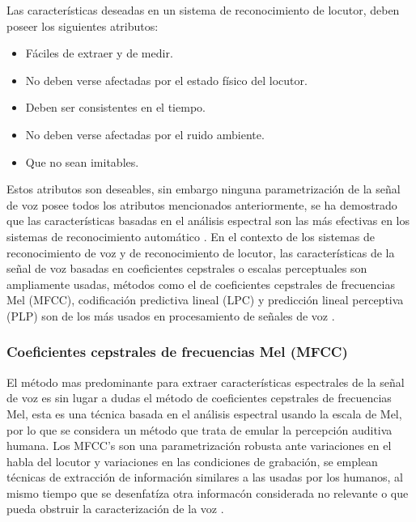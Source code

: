 Las caracter\'isticas deseadas en un sistema de reconocimiento de locutor, deben poseer los siguientes atributos:
\begin{itemize}
	\item F\'aciles de extraer y de medir.
	\item No deben verse afectadas por el estado f\'isico del locutor.
	\item Deben ser consistentes en el tiempo.
	\item No deben verse afectadas por el ruido ambiente.
	\item Que no sean imitables.\\
\end{itemize}

Estos atributos son deseables, sin embargo ninguna parametrizaci\'on de la señal de voz posee todos los atributos mencionados anteriormente, se ha demostrado que las caracter\'isticas basadas en el an\'alisis espectral son las m\'as efectivas en los sistemas de reconocimiento autom\'atico \cite{feng}. En el contexto de los sistemas de reconocimiento de voz y de reconocimiento de locutor, las caracter\'isticas de la señal de voz basadas en coeficientes cepstrales o escalas perceptuales son ampliamente usadas, m\'etodos como el de coeficientes cepstrales de frecuencias Mel (MFCC), codificaci\'on predictiva lineal (LPC) y predicci\'on lineal perceptiva (PLP) son de los m\'as usados en procesamiento de señales de voz \cite{namrata}.\\


\subsubsection{Coeficientes cepstrales de frecuencias Mel (MFCC)}

El m\'etodo mas predominante para extraer caracter\'isticas espectrales de la señal de voz es sin lugar a dudas el m\'etodo de coeficientes cepstrales de frecuencias Mel, esta es una t\'ecnica basada en el an\'alisis espectral usando la escala de Mel, por lo que se considera un m\'etodo que trata de emular la percepci\'on auditiva humana. Los MFCC's son una parametrizaci\'on robusta ante variaciones en el habla del locutor y variaciones en las condiciones de grabaci\'on, se emplean t\'ecnicas de extracci\'on de informaci\'on similares a las usadas por los humanos, al mismo tiempo que se desenfat\'iza otra informac\'on considerada no relevante o que pueda obstruir la caracterizaci\'on de la voz \cite{namrata}.\\

